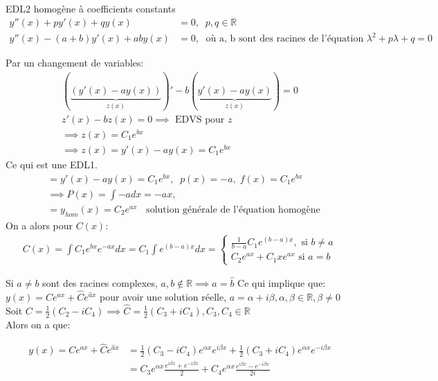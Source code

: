     \begin{parag}{EDL2 homogène à coefficients constants}
        \begin{align*}
            y''(x) + py'(x) + qy(x) &= 0, \; \; p, q \in  \mathbb{R} \\
            y''(x) - (a + b)y'(x) + aby(x) &= 0, \; \text{ où a, b sont des racines de l'équation } \lambda^2 + p \lambda + q = 0
        \end{align*}
        
        Par un changement de variables:
        \begin{align*}
            ( \underbrace{(y'(x) - ay(x))}_{z(x)})' - b( \underbrace{y'(x) - ay(x)}_{z(x)}) = 0 \\
            z'(x) - bz(x) = 0 \implies \text{ EDVS pour } z \\
            \implies z(x) = C_1 e^{bx} \\
            \implies z(x) = y'(x) - ay(x) = C_1 e^{bx}
        \end{align*}
        Ce qui est une EDL1.
        \begin{align*}
            &=y'(x) - ay(x) = C_1e^{bx}, \; \;  p(x) = -a, \; f(x) = C_1 e^{bx} \\
            &\implies P(x) = \int -adx = -ax, \\
           &=y_{hom}(x) = C_2e^{ax} \; \; \text{ solution générale de l'équation homogène}
        \end{align*}
        On a alors pour $C(x)$:
        \begin{align*}
            C(x) = \int C_1e^{bx} e^{-ax} dx = C_1 \int e^{(b-a)x}dx = \begin{cases} \frac{1}{b-a}C_1 e^{(b-a)x}, \text{ si } b \neq a \\ C_2 e^{ax} + C_1 xe^{ax} \text{ si } a = b \end{cases}
        \end{align*}

    
        Si $a \neq b$ sont des racines complexes, $a, b \notin \mathbb{R} \implies a = \hat{b}$
        Ce qui implique que: $y(x) = Ce^{ax} + \hat{C} e^{\hat{a}x}$ pour avoir une solution réelle, $a = \alpha + i \beta , \alpha, \beta \in \mathbb{R}, \beta \neq 0$
        \\        Soit $C = \frac{1}{2}(C_2 - iC_4) \implies \hat{C} = \frac{1}{2} (C_3 + iC_4), C_3, C_4 \in \mathbb{R} $ \\
        Alors on a que:

        \begin{align*}
                  y(x) = Ce^{ax} + \hat{C}e^{\hat{a}x} &= \frac{1}{2}(C_3 -  iC_4)e^{ \alpha x}e^{i \beta x} + \frac{1}{2}(C_3 + iC_4)e^{ \alpha x} e^{-i \beta x}\\
                                                       &= C_3 e^{ \alpha x} \frac{e^{i \beta x } + e^{-i \beta x}}{2} + C_4 e^{ \alpha x} \frac{e^{i \beta x} - e^{- i \beta x}}{2i}
          \end{align*} 
    
    \end{parag}
    
